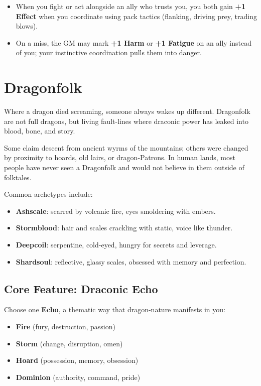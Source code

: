 \documentclass[11pt]{book}
\begin{document}
\begin{itemize}
  \item When you fight or act alongside an ally who trusts you, you both gain \textbf{+1 Effect} when you coordinate using pack tactics (flanking, driving prey, trading blows).
  \item On a miss, the GM may mark \textbf{+1 Harm} or \textbf{+1 Fatigue} on an ally instead of you;
        your instinctive coordination pulls them into danger.
\end{itemize}

\section{Dragonfolk}
\label{sec:dragonfolk}

Where a dragon died screaming, someone always wakes up different. Dragonfolk are not full dragons, but living fault-lines where draconic power has leaked into blood, bone, and story.

Some claim descent from ancient wyrms of the mountains; others were changed by proximity to hoards, old lairs, or dragon-Patrons. In human lands, most people have never seen a Dragonfolk and would not believe in them outside of folktales.

Common archetypes include:
\begin{itemize}
  \item \textbf{Ashscale}: scarred by volcanic fire, eyes smoldering with embers.
  \item \textbf{Stormblood}: hair and scales crackling with static, voice like thunder.
  \item \textbf{Deepcoil}: serpentine, cold-eyed, hungry for secrets and leverage.
  \item \textbf{Shardsoul}: reflective, glassy scales, obsessed with memory and perfection.
\end{itemize}

\subsection{Core Feature: Draconic Echo}
\label{subsec:draconic_echo}

Choose one \textbf{Echo}, a thematic way that dragon-nature manifests in you:
\begin{itemize}
  \item \textbf{Fire} (fury, destruction, passion)
  \item \textbf{Storm} (change, disruption, omen)
  \item \textbf{Hoard} (possession, memory, obsession)
  \item \textbf{Dominion} (authority, command, pride)
\end{itemize}
\end{document}
